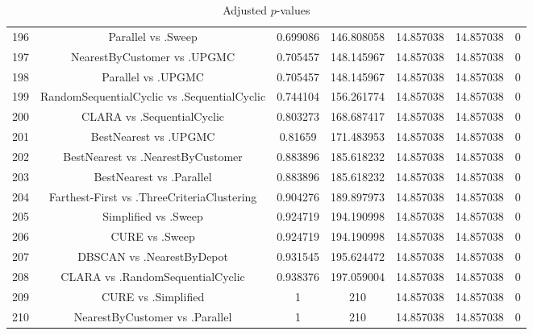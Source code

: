 \documentclass[a4paper,10pt]{article}
\begin{document}
\begin{landscape}
\begin{table}[!htp]
\begin{tabular}{ccccccc}
196&Parallel vs .Sweep&0.699086&146.808058&14.857038&14.857038&0\\
197&NearestByCustomer vs .UPGMC&0.705457&148.145967&14.857038&14.857038&0\\
198&Parallel vs .UPGMC&0.705457&148.145967&14.857038&14.857038&0\\
199&RandomSequentialCyclic vs .SequentialCyclic&0.744104&156.261774&14.857038&14.857038&0\\
200&CLARA vs .SequentialCyclic&0.803273&168.687417&14.857038&14.857038&0\\
201&BestNearest vs .UPGMC&0.81659&171.483953&14.857038&14.857038&0\\
202&BestNearest vs .NearestByCustomer&0.883896&185.618232&14.857038&14.857038&0\\
203&BestNearest vs .Parallel&0.883896&185.618232&14.857038&14.857038&0\\
204&Farthest-First vs .ThreeCriteriaClustering&0.904276&189.897973&14.857038&14.857038&0\\
205&Simplified vs .Sweep&0.924719&194.190998&14.857038&14.857038&0\\
206&CURE vs .Sweep&0.924719&194.190998&14.857038&14.857038&0\\
207&DBSCAN vs .NearestByDepot&0.931545&195.624472&14.857038&14.857038&0\\
208&CLARA vs .RandomSequentialCyclic&0.938376&197.059004&14.857038&14.857038&0\\
209&CURE vs .Simplified&1&210&14.857038&14.857038&0\\
210&NearestByCustomer vs .Parallel&1&210&14.857038&14.857038&0\\
\hline
\end{tabular}
\caption{Adjusted $p$-values}
\end{table}

\end{landscape}
\end{document}

